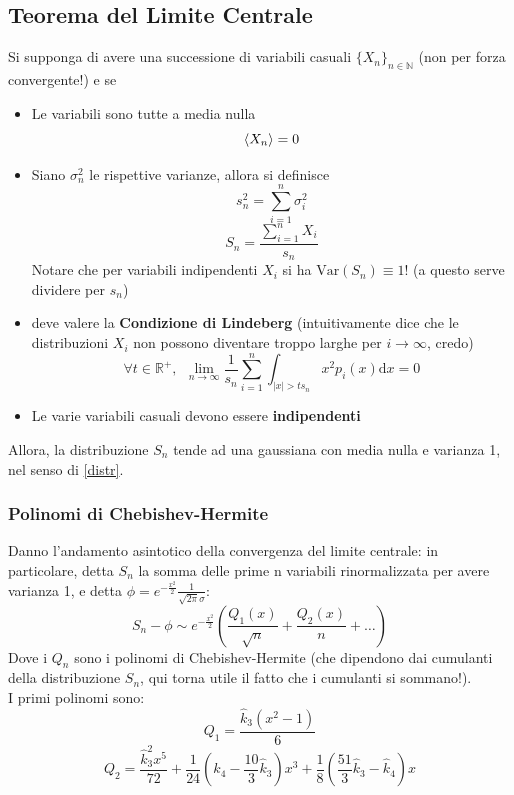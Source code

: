 \documentclass[a4paper,12pt]{article}
\theoremstyle{plain}
\theoremstyle{definition}
\newcommand{\f}[2]{\frac{#1}{#2}}
\newcommand{\Var}{\mathrm{Var}}
\renewcommand{\d}{\text{d}}
\theoremstyle{remark}
\begin{document}
\subsection{Teorema del Limite Centrale}
Si supponga di avere una successione di variabili casuali $\{X_n\}_{n\in\mathbb{N}}$ (non per forza convergente!) e se
\begin{itemize}
	\item Le variabili sono tutte a media nulla \[\expval{X_n}=0\]
\item Siano $\sigma_n^2$ le rispettive varianze, allora si definisce 
\[s_n^2=\sum_{i=1}^n \sigma_i^2\]
\[S_n=\f{\sum_{i=1}^n	{X_i}}{s_n}	\]
Notare che per variabili indipendenti $X_i$ si ha $\Var{(S_n)}\equiv1$! (a questo serve dividere per $s_n$)\item deve valere la \textbf{Condizione di Lindeberg} (intuitivamente dice che le distribuzioni $X_i$ non possono diventare troppo larghe per $i\rightarrow\infty$, credo)
\[\forall t\in\mathbb{R}^+,\:\:\lim_{n\rightarrow\infty}\f{1}{s_n}\sum_{i=1}^n\int_{|x|>ts_n} x^2 p_i(x) \d x =0\]
\item Le varie variabili casuali devono essere \textbf{indipendenti}\end{itemize}
Allora, la distribuzione $S_n$ tende ad una gaussiana con media nulla e varianza 1, nel senso di \ref{distr}.


\subsubsection{Polinomi di Chebishev-Hermite}
Danno l'andamento asintotico della convergenza del limite centrale: in particolare, detta $S_n$ la somma delle prime n variabili rinormalizzata per avere varianza 1, e detta $\phi=e^{-\f{x^2}{2}}\f{1}{\sqrt{2\pi}\sigma}$:
\[S_n-\phi	\sim e^{-\f{x^2}{2}}\left(\f{Q_1({x})}{\sqrt{n}}+\f{Q_2({x})}{{n}}+\ldots\right)\]
Dove i $Q_n$ sono i polinomi di Chebishev-Hermite (che dipendono dai cumulanti della distribuzione $S_n$, qui torna utile il fatto che i cumulanti si sommano!).\\ I primi polinomi sono:
\[Q_1=\f{\hat{k}_3(x^2-1)}{6}\]
\[Q_2=\f{\hat{k}_3^2 x^5}{72}	+\f{1}{24}\left(\hat{k}_4-\f{10}{3}\hat{k}_3\right)	x^3+\f{1}{8}\left(\f{51}{3}\hat{k}_3-\hat{k}_4\right)x	\]
\end{document}
